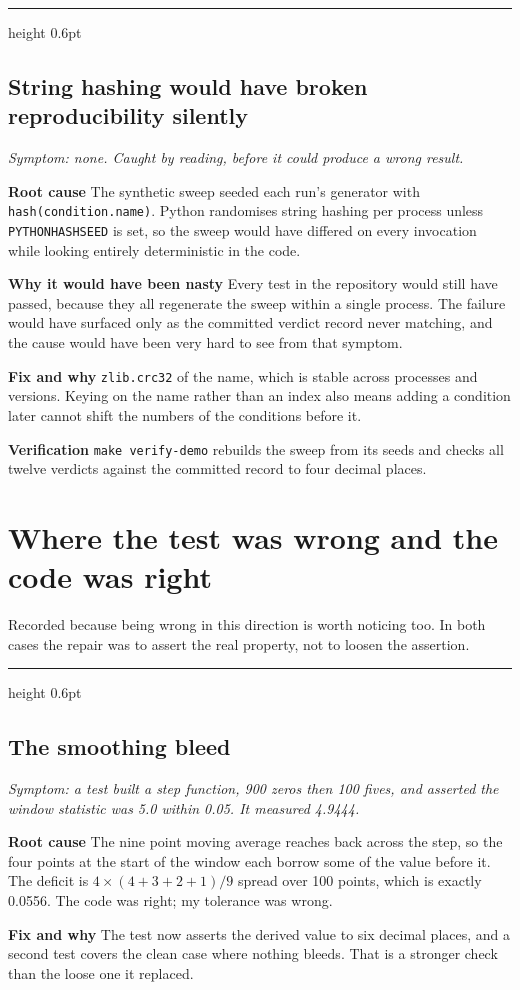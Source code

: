 \documentclass[11pt,a4paper]{article}
\newcommand{\entry}[2]{%
  \vspace{0.6em}%
  {\color{rulegrey}\hrule height 0.6pt}%
  \vspace{0.5em}%
  \subsection*{#1}%
  \textit{\small #2}\par\vspace{0.3em}%
}
\newcommand{\field}[1]{\vspace{0.35em}\textbf{#1}\quad}
\begin{document}
\entry{String hashing would have broken reproducibility silently}{Symptom: none.
Caught by reading, before it could produce a wrong result.}

\field{Root cause} The synthetic sweep seeded each run's generator with
\verb|hash(condition.name)|. Python randomises string hashing per process unless
\verb|PYTHONHASHSEED| is set, so the sweep would have differed on every
invocation while looking entirely deterministic in the code.

\field{Why it would have been nasty} Every test in the repository would still
have passed, because they all regenerate the sweep within a single process. The
failure would have surfaced only as the committed verdict record never matching,
and the cause would have been very hard to see from that symptom.

\field{Fix and why} \verb|zlib.crc32| of the name, which is stable across
processes and versions. Keying on the name rather than an index also means adding
a condition later cannot shift the numbers of the conditions before it.

\field{Verification} \texttt{make verify-demo} rebuilds the sweep from its seeds
and checks all twelve verdicts against the committed record to four decimal
places.

\section{Where the test was wrong and the code was right}

Recorded because being wrong in this direction is worth noticing too. In both
cases the repair was to assert the real property, not to loosen the assertion.

\entry{The smoothing bleed}{Symptom: a test built a step function, 900 zeros then
100 fives, and asserted the window statistic was 5.0 within 0.05. It measured
4.9444.}

\field{Root cause} The nine point moving average reaches back across the step, so
the four points at the start of the window each borrow some of the value before
it. The deficit is $4 \times (4+3+2+1) / 9$ spread over 100 points, which is
exactly 0.0556. The code was right; my tolerance was wrong.

\field{Fix and why} The test now asserts the derived value to six decimal places,
and a second test covers the clean case where nothing bleeds. That is a stronger
check than the loose one it replaced.
\end{document}
